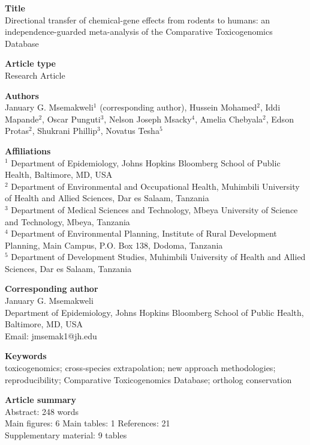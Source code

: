 \documentclass[11pt]{article}
\begin{document}
\vspace{4pt}
\textbf{\large Title}\\[2pt]
Directional transfer of chemical-gene effects from rodents to humans: an
independence-guarded meta-analysis of the Comparative Toxicogenomics Database

\vspace{6pt}
\textbf{\large Article type}\\[2pt]
Research Article

\vspace{6pt}
\textbf{\large Authors}\\[2pt]
January G. Msemakweli$^{1}$ (corresponding author), Hussein Mohamed$^{2}$,
Iddi Mapande$^{2}$, Oscar Punguti$^{3}$, Nelson Joseph Msacky$^{4}$,
Amelia Chebyala$^{2}$, Edson Protas$^{2}$, Shukrani Phillip$^{3}$,
Novatus Tesha$^{5}$

\vspace{6pt}
\textbf{\large Affiliations}\\[2pt]
$^{1}$ Department of Epidemiology, Johns Hopkins Bloomberg School of Public
Health, Baltimore, MD, USA \\
$^{2}$ Department of Environmental and Occupational Health, Muhimbili University
of Health and Allied Sciences, Dar es Salaam, Tanzania \\
$^{3}$ Department of Medical Sciences and Technology, Mbeya University of Science
and Technology, Mbeya, Tanzania \\
$^{4}$ Department of Environmental Planning, Institute of Rural Development
Planning, Main Campus, P.O. Box 138, Dodoma, Tanzania \\
$^{5}$ Department of Development Studies, Muhimbili University of Health and
Allied Sciences, Dar es Salaam, Tanzania

\vspace{6pt}
\textbf{\large Corresponding author}\\[2pt]
January G. Msemakweli \\
Department of Epidemiology, Johns Hopkins Bloomberg School of Public Health,
Baltimore, MD, USA \\
Email: jmsemak1@jh.edu

\vspace{6pt}
\textbf{\large Keywords}\\[2pt]
toxicogenomics; cross-species extrapolation; new approach methodologies;
reproducibility; Comparative Toxicogenomics Database; ortholog conservation

\vspace{6pt}
\textbf{\large Article summary}\\[2pt]
Abstract: 248 words \\
Main figures: 6 \quad Main tables: 1 \quad References: 21 \\
Supplementary material: 9 tables
\end{document}
